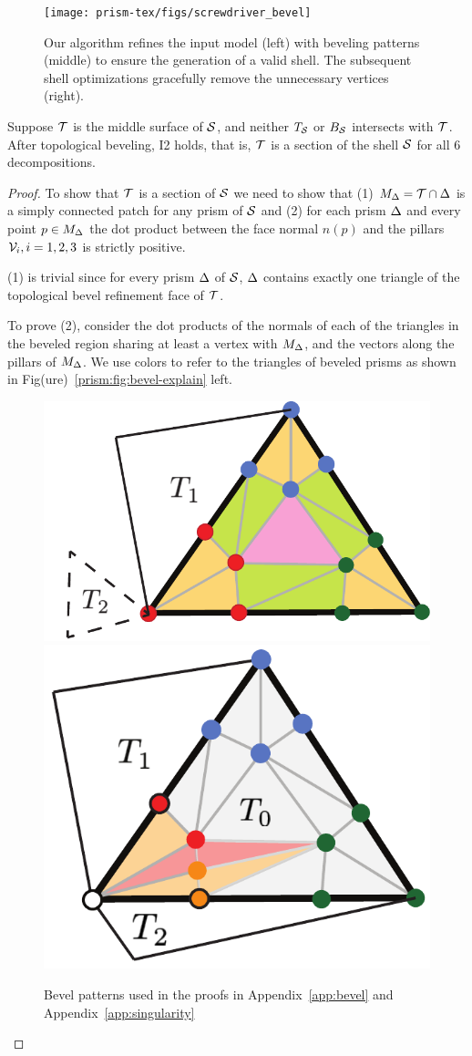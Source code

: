 \begin{figure}
    \texttt{[image: prism-tex/figs/screwdriver\_bevel]}
    \caption{Our algorithm refines the input model (left) with beveling patterns (middle) to ensure the generation of a valid shell. The subsequent shell optimizations gracefully remove the unnecessary vertices (right).}
    \label{prism:fig:beveled_example}
    
\end{figure}

\begin{theorem}
\label{thm:bevel}
Suppose $\T$ is the middle surface of $\S$, and neither $T_\S$ or $B_\S$ intersects with $\T$. After topological beveling, I2 holds, that is, $\T$ is a section of the shell $\S$ for all 6 decompositions.
\end{theorem}
\begin{proof}
    To show that $\T$ is a section of $\S$ we need to show that (1) $M_\Prism= \T \cap \Prism$ is a simply connected patch  for any prism of $\S$
and (2) for {each prism $\Prism$} and every point $p\in M_\Prism$ the dot product between the face normal $n(p)$ and the {pillars} $\V_i, i=1,2,3$ is strictly {positive}.

(1) is trivial since for every prism $\Prism$ of $\S$, $\Prism$ contains exactly one {triangle of the topological bevel refinement} face of $\T$.%


To prove (2), consider the dot products of the normals of each of the triangles in the beveled region sharing at least a vertex with $M_\Prism$, and the vectors along the pillars of $M_\Prism$.
We use colors to refer to the triangles of beveled prisms as shown in Fig\remove(ure)~\ref{prism:fig:bevel-explain} left. 


\begin{figure}
    \centering
    \includegraphics[width=0.5\linewidth]{prism-tex/figs/bevel_colors}
    \includegraphics[width=0.4\linewidth]{prism-tex/figs/singularity-bevel-explained}
    \caption{Bevel patterns used in the proofs in Appendix~\ref{app:bevel} and Appendix~\ref{app:singularity}}
    

\end{figure}
\end{proof}
